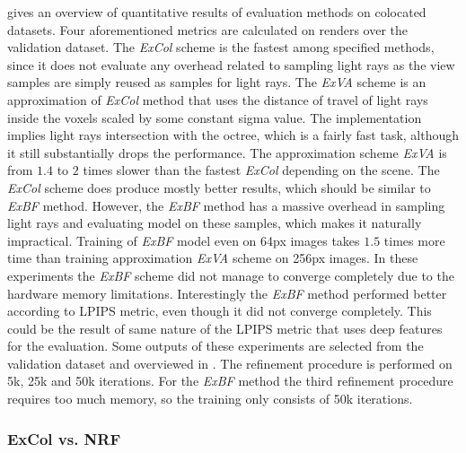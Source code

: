  gives an overview of quantitative results of evaluation methods on colocated datasets.
Four aforementioned metrics are calculated on renders over the validation dataset.
The \textit{ExCol} scheme is the fastest among specified methods,
since it does not evaluate any overhead related to sampling light rays
as the view samples are simply reused as samples for light rays.
The \textit{ExVA} scheme is an approximation of \textit{ExCol} method
that uses the distance of travel of light rays inside the voxels scaled by some constant sigma value.
The implementation implies light rays intersection with the octree,
which is a fairly fast task, although it still substantially drops the performance.
The approximation scheme \textit{ExVA} is from $1.4$ to $2$ times slower
than the fastest \textit{ExCol} depending on the scene.
The \textit{ExCol} scheme does produce mostly better results,
which should be similar to \textit{ExBF} method.
However, the \textit{ExBF} method has a massive overhead in sampling light rays
and evaluating model on these samples,
which makes it naturally impractical.
Training of \textit{ExBF} model even on 64px images takes $1.5$ times more time
than training approximation \textit{ExVA} scheme on 256px images.
In these experiments the \textit{ExBF} scheme did not manage
to converge completely due to the hardware memory limitations.
Interestingly the \textit{ExBF} method performed better according to
LPIPS metric, even though it did not converge completely.
This could be the result of same nature of the LPIPS metric
that uses deep features for the evaluation.
Some outputs of these experiments are selected from the validation dataset
and overviewed in .
The refinement procedure is performed on 5k, 25k and 50k iterations.
For the \textit{ExBF} method the third refinement procedure requires too much memory,
so the training only consists of 50k iterations.





\subsubsection{ExCol vs. NRF}


